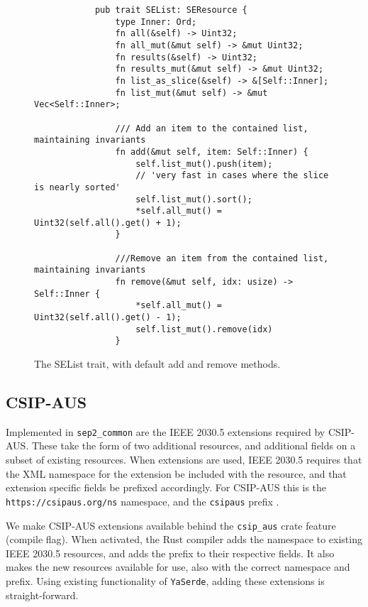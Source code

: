 \begin{figure}[H]
    \begin{center}
        \begin{lstlisting}
            pub trait SEList: SEResource {
                type Inner: Ord;
                fn all(&self) -> Uint32;
                fn all_mut(&mut self) -> &mut Uint32;
                fn results(&self) -> Uint32;
                fn results_mut(&mut self) -> &mut Uint32;
                fn list_as_slice(&self) -> &[Self::Inner];
                fn list_mut(&mut self) -> &mut Vec<Self::Inner>;
            
                /// Add an item to the contained list, maintaining invariants
                fn add(&mut self, item: Self::Inner) {
                    self.list_mut().push(item);
                    // 'very fast in cases where the slice is nearly sorted'
                    self.list_mut().sort();
                    *self.all_mut() = Uint32(self.all().get() + 1);
                }
                
                ///Remove an item from the contained list, maintaining invariants
                fn remove(&mut self, idx: usize) -> Self::Inner {
                    *self.all_mut() = Uint32(self.all().get() - 1);
                    self.list_mut().remove(idx)
                }
        \end{lstlisting}
        \label{fig:listtraitimpl}
        \caption{The SEList trait, with default add and remove methods.}
    \end{center}
\end{figure}

\subsection{CSIP-AUS}
Implemented in \texttt{sep2\_common} are the IEEE 2030.5 extensions required by CSIP-AUS. These take the form of two additional resources, and additional fields on a subset of existing resources. When extensions are used, IEEE 2030.5 requires that the XML namespace for the extension be included with the resource, and that extension specific fields be prefixed accordingly. For CSIP-AUS this is the \texttt{https://csipaus.org/ns} namespace, and the \texttt{csipaus} prefix  \cite{CSIPAus}.

We make CSIP-AUS extensions available behind the \texttt{csip\_aus} crate feature (compile flag). When activated, the Rust compiler adds the namespace to existing IEEE 2030.5 resources, and adds the prefix to their respective fields. It also makes the new resources available for use, also with the correct namespace and prefix. Using existing functionality of \texttt{YaSerde}, adding these extensions is straight-forward.

